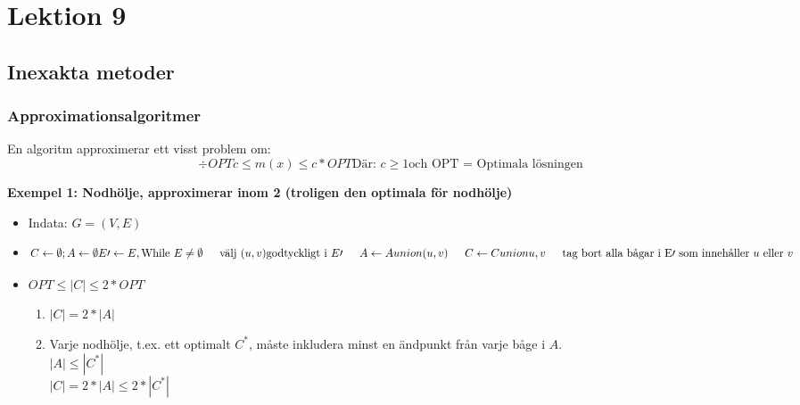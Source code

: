 \section{Lektion 9}
\subsection{Inexakta metoder}

\subsubsection{Approximationsalgoritmer}
En algoritm approximerar ett visst problem om: \\
\begin{equation}
  \div{OPT}{c} \leq m(x) \leq c * OPT
  \text{Där: } c \geq 1 \text{och OPT = Optimala lösningen}
  
\end{equation}

\textbf{Exempel 1: Nodhölje, approximerar inom 2 (troligen den optimala för nodhölje)}
\begin{itemize}
\item{Indata: \(G=(V,E)\)  }
\item{
    \begin{equation}
      C \leftarrow \emptyset; A \leftarrow \emptyset \\
      E\prime \leftarrow E, \\
      \text{While } E \neq \emptyset \\
      \indent \text{välj } (u,v) \text{godtyckligt i } E\prime \\
      \indent A \leftarrow A union {(u,v)} \\
      \indent C \leftarrow C union {u,v} \\
      \indent \text{tag bort alla bågar i E$\prime$ som innehåller $u$ eller $v$} \\
    \end{equation}
  }
\item{ \(OPT \leq |C| \leq 2 * OPT\)\\
    \begin{enumerate}
    \item{\(|C| = 2 * |A|\)}
      \item{Varje nodhölje, t.ex. ett optimalt \(C^*\), måste inkludera minst en
          ändpunkt från varje båge i $A$. \\
          \(|A| \leq |C^*|\) \\
        \(|C| = 2 * |A| \leq 2 * |C^*|\)}
    \end{enumerate}
    
  }
\end{itemize}


